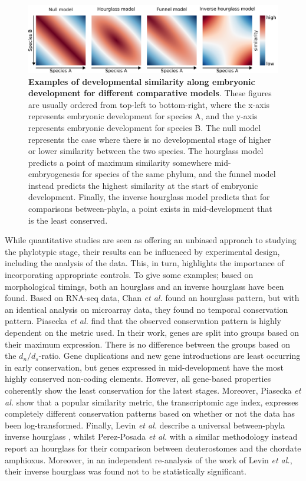 \begin{figure}[H]
    \includegraphics[width=\linewidth]{ch.hourglass/images/models.png}
    \caption{\textbf{Examples of developmental similarity along embryonic development for different comparative models}. These figures are usually ordered from top-left to bottom-right, where the x-axis represents embryonic development for species A, and the y-axis represents embryonic development for species B. The null model represents the case where there is no developmental stage of higher or lower similarity between the two species. The hourglass model predicts a point of maximum similarity somewhere mid-embryogenesis for species of the same phylum, and the funnel model instead predicts the highest similarity at the start of embryonic development. Finally, the inverse hourglass model predicts that for comparisons between-phyla, a point exists in mid-development that is the least conserved.}
    \label{fig:models}
\end{figure}

While quantitative studies are seen as offering an unbiased approach to studying the phylotypic stage, their results can be influenced by experimental design, including the analysis of the data. This, in turn, highlights the importance of incorporating appropriate controls. To give some examples; based on morphological timings, both an hourglass\cite{Cordero2020} and an inverse hourglass\cite{OlafRP2003} have been found. Based on RNA-seq data, Chan \textit{et al.} found an hourglass pattern, but with an identical analysis on microarray data, they found no temporal conservation pattern\cite{Chan2021}. Piasecka \textit{et al.} find that the observed conservation pattern is highly dependent on the metric used. In their work, genes are split into groups based on their maximum expression. There is no difference between the groups based on the $d_n / d_s$-ratio. Gene duplications and new gene introductions are least occurring in early conservation, but genes expressed in mid-development have the most highly conserved non-coding elements. However, all gene-based properties coherently show the least conservation for the latest stages\cite{Piasecka2013}. Moreover, Piasecka \textit{et al.} show that a popular similarity metric, the transcriptomic age index\cite{DomazetLoso2010}, expresses completely different conservation patterns based on whether or not the data has been log-transformed\cite{Piasecka2013}. Finally, Levin \textit{et al.} describe a universal between-phyla inverse hourglass \cite{Levin2016}, whilst Perez-Posada \textit{et al.} with a similar methodology instead report an hourglass for their comparison between deuterostomes and the chordate amphioxus\cite{PerezPosada2022}. Moreover, in an independent re-analysis of the work of Levin \textit{et al.}, their inverse hourglass was found not to be statistically significant\cite{Dunn2018}. 

